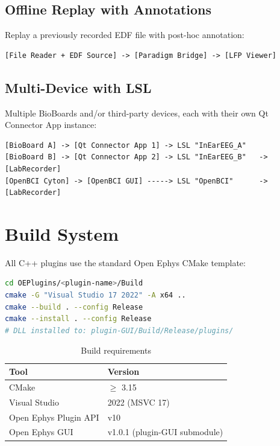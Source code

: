 \documentclass[11pt,a4paper]{article}
\begin{document}
\subsection{Offline Replay with Annotations}

Replay a previously recorded EDF file with post-hoc annotation:

\begin{lstlisting}
[File Reader + EDF Source] -> [Paradigm Bridge] -> [LFP Viewer]
\end{lstlisting}

\subsection{Multi-Device with LSL}

Multiple BioBoards and/or third-party devices, each with their own
Qt Connector App instance:

\begin{lstlisting}
[BioBoard A] -> [Qt Connector App 1] -> LSL "InEarEEG_A"
[BioBoard B] -> [Qt Connector App 2] -> LSL "InEarEEG_B"   -> [LabRecorder]
[OpenBCI Cyton] -> [OpenBCI GUI] -----> LSL "OpenBCI"      -> [LabRecorder]
\end{lstlisting}


\section{Build System}
\label{sec:build}

All C++ plugins use the standard Open Ephys CMake template:

\begin{lstlisting}[language=bash, caption={Building a plugin}]
cd OEPlugins/<plugin-name>/Build
cmake -G "Visual Studio 17 2022" -A x64 ..
cmake --build . --config Release
cmake --install . --config Release
# DLL installed to: plugin-GUI/Build/Release/plugins/
\end{lstlisting}

\begin{table}[H]
\centering
\caption{Build requirements}
\begin{tabular}{l l}
\toprule
\textbf{Tool} & \textbf{Version} \\
\midrule
CMake                & $\geq$ 3.15 \\
Visual Studio        & 2022 (MSVC 17) \\
Open Ephys Plugin API & v10 \\
Open Ephys GUI       & v1.0.1 (plugin-GUI submodule) \\
\bottomrule
\end{tabular}
\end{table}
\end{document}
